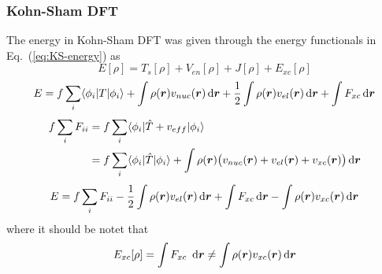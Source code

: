 \subsubsection{Kohn-Sham DFT}
The energy in Kohn-Sham DFT was given through the energy functionals in Eq.~(\ref{eq:KS-energy}) as
\begin{equation}
    E[\rho] = T_s[\rho] + V_{en}[\rho] + J[\rho] + E_{xc}[\rho]
\end{equation}
\begin{equation}
    E = f \sum_i \langle \phi_i|T|\phi_i \rangle
	+ \int \rho(\boldsymbol r)v_{nuc}(\boldsymbol r) \,\mathrm{d}\boldsymbol r
	+ \frac{1}{2} \int \rho(\boldsymbol r)v_{el}(\boldsymbol r) \,\mathrm{d}\boldsymbol r
	+ \int F_{xc} \,\mathrm{d}\boldsymbol r
\end{equation}
\begin{align}
    f \sum_i F_{ii} &= f \sum_i \langle\phi_i|\hat{T} + v_{eff}|\phi_i\rangle\\
		    &= f \sum_i \langle\phi_i|\hat{T}|\phi_i\rangle
		     + \int \rho(\boldsymbol r)\big(v_{nuc}(\boldsymbol r) + v_{el}(\boldsymbol r) + v_{xc}(\boldsymbol r)\big) \,\mathrm{d}\boldsymbol r
\end{align}
\begin{equation}
    E = f \sum_i F_{ii} - \frac{1}{2} \int \rho(\boldsymbol r)v_{el}(\boldsymbol r) \,\mathrm{d}\boldsymbol r
	+ \int F_{xc} \,\mathrm{d}\boldsymbol r - \int \rho(\boldsymbol r)v_{xc}(\boldsymbol r) \,\mathrm{d}\boldsymbol r
\end{equation}
where it should be notet that 
\begin{equation}
    E_{xc}[\rho] = \int F_{xc} \ud\bs{r} \neq \int \rho(\bs{r})v_{xc}(\bs{r}) \ud\bs{r}
\end{equation}
